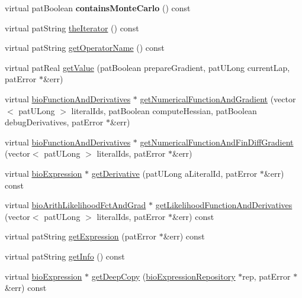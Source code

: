\begin{DoxyCompactItemize}
\item 
\mbox{\label{classbio_expression_a196d9f839018800d5a0549ea567d5989}} 
virtual pat\+Boolean {\bfseries contains\+Monte\+Carlo} () const
\item 
virtual pat\+String \hyperlink{classbio_expression_a9830c0cf012012c811b826adc54291f6}{the\+Iterator} () const
\item 
virtual pat\+String \hyperlink{classbio_expression_a2353a4afb3a2b0af7c63aba086a72bde}{get\+Operator\+Name} () const
\item 
virtual pat\+Real \hyperlink{classbio_expression_af58662a5d4d456f15bc4f2c9bd4f8a5b}{get\+Value} (pat\+Boolean prepare\+Gradient, pat\+U\+Long current\+Lap, pat\+Error $\ast$\&err)
\item 
virtual \hyperlink{classbio_function_and_derivatives}{bio\+Function\+And\+Derivatives} $\ast$ \hyperlink{classbio_expression_a91c81ce80c9e972c913b10f5f3c1ed13}{get\+Numerical\+Function\+And\+Gradient} (vector$<$ pat\+U\+Long $>$ literal\+Ids, pat\+Boolean compute\+Hessian, pat\+Boolean debug\+Derivatives, pat\+Error $\ast$\&err)
\item 
virtual \hyperlink{classbio_function_and_derivatives}{bio\+Function\+And\+Derivatives} $\ast$ \hyperlink{classbio_expression_a2af51db0148a3fecce133ca4fa4a0bdc}{get\+Numerical\+Function\+And\+Fin\+Diff\+Gradient} (vector$<$ pat\+U\+Long $>$ literal\+Ids, pat\+Error $\ast$\&err)
\item 
virtual \hyperlink{classbio_expression}{bio\+Expression} $\ast$ \hyperlink{classbio_expression_a5915579d1193f25f216c1e273c97f2ce}{get\+Derivative} (pat\+U\+Long a\+Literal\+Id, pat\+Error $\ast$\&err) const
\item 
virtual \hyperlink{classbio_arith_likelihood_fct_and_grad}{bio\+Arith\+Likelihood\+Fct\+And\+Grad} $\ast$ \hyperlink{classbio_expression_a30e6b5a6363c93af4aa8ce7a42be6e65}{get\+Likelihood\+Function\+And\+Derivatives} (vector$<$ pat\+U\+Long $>$ literal\+Ids, pat\+Error $\ast$\&err) const
\item 
virtual pat\+String \hyperlink{classbio_expression_a66a83eb0caac18dd5e568ffde5a8b5d4}{get\+Expression} (pat\+Error $\ast$\&err) const
\item 
virtual pat\+String \hyperlink{classbio_expression_aef7f12e945c110c84918b7af6c819c7f}{get\+Info} () const
\item 
virtual \hyperlink{classbio_expression}{bio\+Expression} $\ast$ \hyperlink{classbio_expression_a4ee1b8add634078a02eaae26cd40dcc8}{get\+Deep\+Copy} (\hyperlink{classbio_expression_repository}{bio\+Expression\+Repository} $\ast$rep, pat\+Error $\ast$\&err) const

\end{DoxyCompactItemize}
